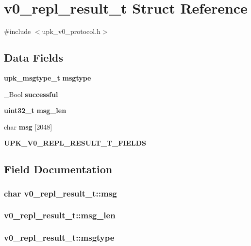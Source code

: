 \section{v0\_\-repl\_\-result\_\-t Struct Reference}
\label{structv0__repl__result__t}


{\ttfamily \#include $<$upk\_\-v0\_\-protocol.h$>$}

\subsection*{Data Fields}
\begin{DoxyCompactItemize}
\item 
{\bf upk\_\-msgtype\_\-t} {\bf msgtype}
\item 
\_\-Bool {\bf successful}
\item 
{\bf uint32\_\-t} {\bf msg\_\-len}
\item 
char {\bf msg} [2048]
\item 
{\bf UPK\_\-V0\_\-REPL\_\-RESULT\_\-T\_\-FIELDS}
\end{DoxyCompactItemize}


\subsection{Field Documentation}
\subsubsection[{msg}]{\setlength{\rightskip}{0pt plus 5cm}char {\bf v0\_\-repl\_\-result\_\-t::msg}}\label{structv0__repl__result__t_a9cc450ff6c55c8f5577762041c62442c}
\subsubsection[{msg\_\-len}]{ {\bf v0\_\-repl\_\-result\_\-t::msg\_\-len}}\label{structv0__repl__result__t_a0abc8e954adeb998595b4b9e585757c4}
\subsubsection[{msgtype}]{ {\bf v0\_\-repl\_\-result\_\-t::msgtype}}\label{structv0__repl__result__t_ad32e97c4b0ccff49eccf25c0e194dd96}
